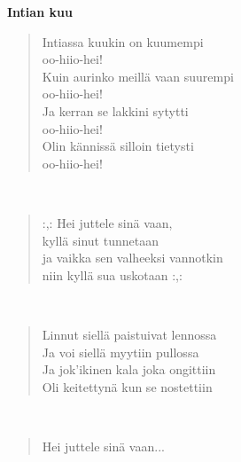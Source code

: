 \noindent\begin{minipage}{\linewidth}
\vspace{5pt}
\parbox[t]{0.85\linewidth}{\raggedright {\large\bf Intian kuu}\\[6pt]}
\begin{verse}
	Intiassa kuukin on kuumempi\\
	oo-hiio-hei!\\
	Kuin aurinko meillä vaan suurempi\\
	oo-hiio-hei!\\
	Ja kerran se lakkini sytytti\\
	oo-hiio-hei!\\
	Olin kännissä silloin tietysti\\
	oo-hiio-hei!\\
\end{verse}
\end{minipage}\\[10pt]
\noindent\begin{minipage}{\linewidth}
\begin{verse}
	\hspace{0pt-\widthof{:,: }}:,: Hei juttele sinä vaan,\\
	kyllä sinut tunnetaan\\
	ja vaikka sen valheeksi vannotkin\\
	niin kyllä sua uskotaan :,:\\
\end{verse}
\end{minipage}\\[10pt]
\noindent\begin{minipage}{\linewidth}
\begin{verse}
	Linnut siellä paistuivat lennossa\\
	Ja voi siellä myytiin pullossa\\
	Ja jok'ikinen kala joka ongittiin\\
	Oli keitettynä kun se nostettiin\\
\end{verse}
\end{minipage}\\[10pt]
\noindent\begin{minipage}{\linewidth}
\begin{verse}
	Hei juttele sinä vaan...\\
\end{verse}
\end{minipage}\\[10pt]
